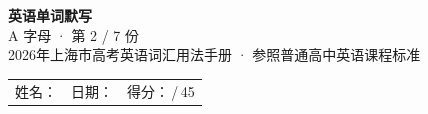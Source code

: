 \documentclass[10pt,a4paper]{article}
\begin{document}
\pagestyle{plain}

\begin{center}
{\LARGE\bfseries 英语单词默写}\\[0.22em]
{\large A 字母 · 第 2 / 7 份}\\[0.18em]
{\small 2026年上海市高考英语词汇用法手册 · 参照普通高中英语课程标准}
\end{center}

\vspace{0.25em}
\noindent\begin{tabular}{@{}p{}@{}p{}@{}p{}@{}}
姓名：\underline{\hspace{2.0cm}} & 日期：\underline{\hspace{2.0cm}} & 得分：\underline{\hspace{1.3cm}}\,/\,45 \\
\end{tabular}

\vspace{0.3em}

\vspace{0.08em}
\end{document}
